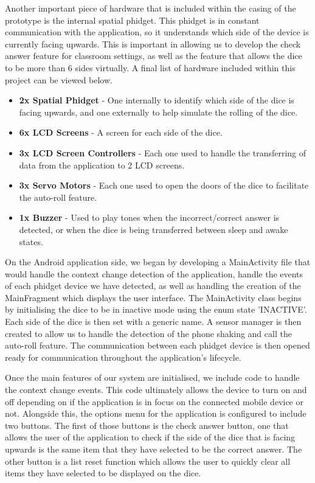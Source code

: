 \documentclass{sigchi}
\begin{document}
Another important piece of hardware that is included within the casing of the prototype is the internal spatial phidget. This phidget is in constant communication with the application, so it understands which side of the device is currently facing upwards. This is important in allowing us to develop the check answer feature for classroom settings, as well as the feature that allows the dice to be more than 6 sides virtually. A final list of hardware included within this project can be viewed below.

\begin{itemize}
    \item \textbf{2x Spatial Phidget} - One internally to identify which side of the dice is facing upwards, and one externally to help simulate the rolling of the dice.
    \item \textbf{6x LCD Screens} - A screen for each side of the dice.
    \item \textbf{3x LCD Screen Controllers} - Each one used to handle the transferring of data from the application to 2 LCD screens.
    \item \textbf{3x Servo Motors} - Each one used to open the doors of the dice to facilitate the auto-roll feature.
    \item \textbf{1x Buzzer} - Used to play tones when the incorrect/correct answer is detected, or when the dice is being transferred between sleep and awake states.
  \end{itemize}

On the Android application side, we began by developing a MainActivity file that would handle the context change detection of the application, handle the events of each phidget device we have detected, as well as handling the creation of the MainFragment which displays the user interface. The MainActivity class begins by initialising the dice to be in inactive mode using the enum state 'INACTIVE'. Each side of the dice is then set with a generic name. A sensor manager is then created to allow us to handle the detection of the phone shaking and call the auto-roll feature. The communication between each phidget device is then opened ready for communication throughout the application's lifecycle. 

Once the main features of our system are initialised, we include code to handle the context change events. This code ultimately allows the device to turn on and off depending on if the application is in focus on the connected mobile device or not. Alongside this, the options menu for the application is configured to include two buttons. The first of those buttons is the check answer button, one that allows the user of the application to check if the side of the dice that is facing upwards is the same item that they have selected to be the correct answer. The other button is a list reset function which allows the user to quickly clear all items they have selected to be displayed on the dice.
\end{document}
